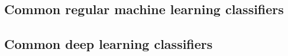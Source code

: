 

\lipsum[1-3]


\subsection{Common regular machine learning classifiers}
\label{subsec:processing_signals_ml_and_dl_ml_classifiers}


\lipsum[1-7]


\subsection{Common deep learning classifiers}
\label{subsec:processing_signals_ml_and_dl_dl_classifiers}



